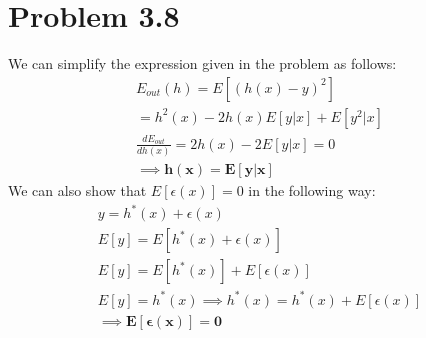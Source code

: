 \documentclass[12pt]{article}
\begin{document}
\section*{Problem 3.8}
We can simplify the expression given in the problem as follows:
\begin{gather*}
	E_{out}(h) = E[(h(x) - y)^2]
	\\ = h^2(x) - 2h(x)E[y|x] + E[y^2|x]
	\\ \frac{dE_{out}}{dh(x)} = 2h(x) - 2E[y|x] = 0
	\\ \implies \boldsymbol{h(x) = E[y|x]}
\end{gather*}
We can also show that $E[\epsilon(x)] = 0$ in the following way:
\begin{gather*}
	y = h^*(x) + \epsilon(x)
	\\ E[y] = E[h^*(x) + \epsilon(x)]
	\\ E[y] = E[h^*(x)] + E[\epsilon(x)]
	\\ E[y] = h^*(x) \implies h^*(x) = h^*(x) + E[\epsilon(x)]
	\\ \implies \boldsymbol{E[\epsilon(x)] = 0}
\end{gather*}
\end{document}
